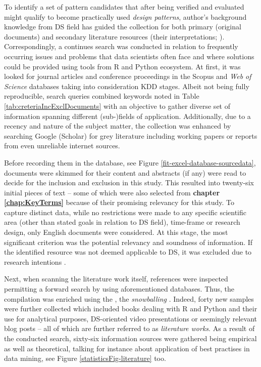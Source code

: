 To identify a set of pattern candidates that after being verified and evaluated might qualify to become practically used \emph{design patterns}, author's background knowledge from \ac{DS} field has guided the collection for both primary (original documents) and secondary literature resources (their interpretations; \cite{InventadoPeter2015}). 
Correspondingly, a continues search was conducted in relation to frequently occurring issues and problems that data scientists often face and where solutions could be provided using tools from R and Python ecosystem.
At first, it was looked for journal articles and conference proceedings in the Scopus and \emph{Web of Science} databases taking into consideration \ac{KDD} stages.
Albeit not being fully reproducible, search queries combined keywords noted in Table \ref{tab:creteriaIncExclDocuments} with an objective to gather diverse set of information spanning different (sub-)fields of application.
Additionally, due to a recency and nature of the subject matter, the collection was enhanced by searching Google (Scholar) for grey literature including working papers or reports from even unreliable internet sources.

Before recording them in the database, see Figure \ref{fit-excel-database-sourcedata}, documents were skimmed for their content and abstracts (if any) were read to decide for the inclusion and exclusion in this study.
This resulted into twenty-six initial pieces of text -- some of which were also selected from \textbf{chapter \ref{chap:KeyTerms}} because of their promising relevancy for this study.
To capture distinct data, while no restrictions were made to any specific scientific area (other than stated goals in relation to \ac{DS} field), time-frame or research design, only English documents were considered. 
At this stage, the most significant criterion was the potential relevancy and soundness of information.
If the identified resource was not deemed applicable to \ac{DS}, it was excluded due to research intentions \parencite{ChenMinMao2014}.

Next, when scanning the literature work itself, references were inspected permitting a forward search by using aforementioned databases.
Thus, the compilation was enriched using the , the \emph{snowballing} \parencites[330]{Noy2008SamplingResearch}{WebsterJaineWatson2002}. 
Indeed, forty new samples were further collected which included books dealing with R and Python and their use for analytical purposes, \ac{DS}-oriented video presentations or seemingly relevant blog posts -- all of which are further referred to as \emph{literature works}.
As a result of the conducted search, sixty-six information sources were gathered being empirical as well as theoretical, talking for instance about application of best practises in data mining, see Figure \ref{statisticsFig-literature} too.

